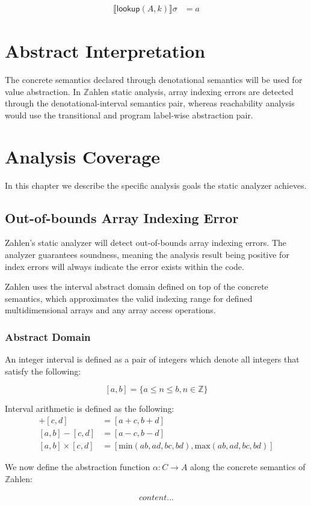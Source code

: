 \documentclass{article}
\begin{document}
	\begin{align*}
		\llbracket \mathsf{lookup}(A, k) \rrbracket \sigma &= a
	\end{align*}
	
	\section{Abstract Interpretation}
	
	The concrete semantics declared through denotational semantics will be used for value abstraction. In $\mathbb{Z}$ahlen static analysis, array indexing errors are detected through the denotational-interval semantics pair, whereas reachability analysis would use the transitional and program label-wise abstraction pair.
	
	\section{Analysis Coverage}
	
	In this chapter we describe the specific analysis goals the static analyzer achieves.
	
	\subsection{Out-of-bounds Array Indexing Error}
	
	Zahlen's static analyzer will detect out-of-bounds array indexing errors. The analyzer guarantees soundness, meaning the analysis result being positive for index errors will always indicate the error exists within the code.
	
	Zahlen uses the interval abstract domain defined on top of the concrete semantics, which approximates the valid indexing range for defined multidimensional arrays and any array access operations.
	
	\subsubsection{Abstract Domain}
	
	An integer interval is defined as a pair of integers which denote all integers that satisfy the following:
	
	$$ [a, b]  = \{ a \leq n \leq b, n \in \mathbb{Z} \}$$
	
	Interval arithmetic is defined as the following:
	\begin{align*}
		[a, b] + [c, d] &= [a + c, b + d] \\
		[a,  b] - [c, d] &= [a - c, b - d] \\
		[a, b] \times [c, d] &= [ \mathrm{min}(ab, ad, bc, bd), \mathrm{max}(ab, ad, bc, bd) ] 
	\end{align*}
	
	We now define the abstraction function $\alpha: C \to A$ along the concrete semantics of $\mathbb{Z}$ahlen:
	
	\begin{align*}
		content...
	\end{align*}

	
\end{document}
